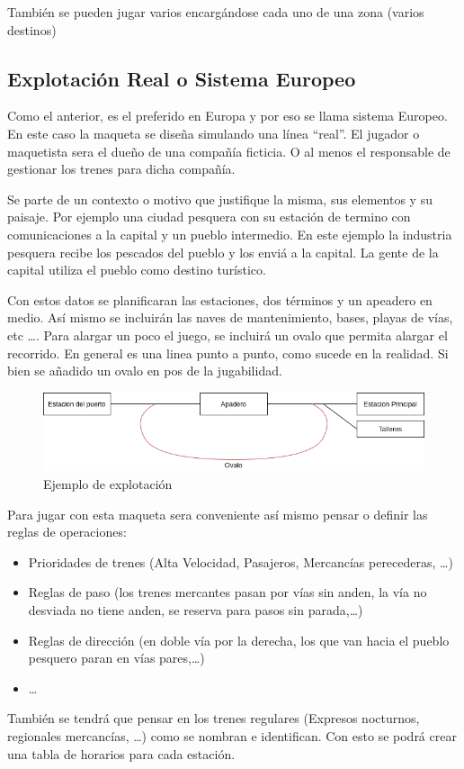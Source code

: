 También se pueden jugar varios encargándose cada uno de una zona (varios destinos)

\subsection{Explotación Real o Sistema Europeo}
Como el anterior, es el preferido en Europa y por eso se llama sistema Europeo. En este caso la maqueta se diseña simulando una línea “real”. El jugador o maquetista sera el dueño de una compañía ficticia. O al menos el responsable de gestionar los trenes para dicha compañía.

Se parte de un contexto o motivo que justifique la misma, sus elementos y su paisaje. Por ejemplo una ciudad pesquera con su estación de termino con comunicaciones a la capital y un pueblo intermedio. En este ejemplo la industria pesquera recibe los pescados del pueblo y los enviá a la capital. La gente de la capital utiliza el pueblo como destino turístico. 

Con estos datos se planificaran las estaciones, dos términos y un apeadero en medio. Así mismo se incluirán las naves de mantenimiento, bases, playas de vías, etc …. Para alargar un poco el juego, se incluirá un ovalo que permita alargar el recorrido. En general es una linea punto a punto, como sucede en la realidad. Si bien se añadido un ovalo en pos de la jugabilidad.

\begin{figure}[h]
	\centering\includegraphics[width=\textwidth]{chapters/01_jugar/HowToPlay-EU.png}
	\caption{Ejemplo de explotación}
	\label{fig:explotacion} %
\end{figure}

Para jugar con esta maqueta sera conveniente así mismo pensar o definir las reglas de operaciones:

\begin{itemize}
	\item Prioridades de trenes (Alta Velocidad, Pasajeros, Mercancías perecederas, …)
\item Reglas de paso (los trenes mercantes pasan por vías sin anden, la vía no desviada no tiene anden, se reserva para pasos sin parada,…)
\item Reglas de dirección (en doble vía por la derecha, los que van hacia el pueblo pesquero paran en vías pares,…)
\item …
\end{itemize}
También se tendrá que pensar en los trenes regulares (Expresos nocturnos, regionales mercancías, …) como se nombran e identifican. Con esto se podrá crear una tabla de horarios para cada estación.

